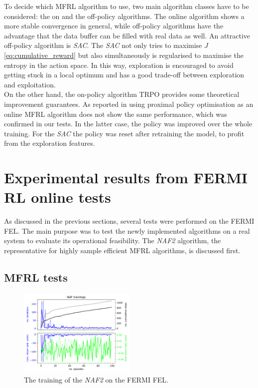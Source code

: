 \documentclass[
reprint,
amsmath,amssymb,amsfonts,clevref,
aps,
prstab,
]{revtex4-2}
\begin{document}
To decide which MFRL algorithm to use, two main algorithm classes have to be considered: the on and the off-policy algorithms. The online algorithm shows a more stable convergence in general, while off-policy algorithms have the advantage that the data buffer can be filled with real data as well. An attractive off-policy algorithm is \emph{SAC}. The \emph{SAC} not only tries to maximise $J$ \cref{eq:cumulative_reward} but also simultaneously is regularised to maximise the entropy in the action space. In this way, exploration is encouraged to avoid getting stuck in a local optimum and has a good trade-off between exploration and exploitation.\\
On the other hand, the on-policy algorithm TRPO \cite{Schulman2015} provides some theoretical improvement guarantees. As reported in \cite{Kurutach2018} using proximal policy optimisation \cite{Schulman2017} as an online MFRL algorithm does not show the same performance, which was confirmed in our tests. In the latter case, the policy was improved over the whole training. For the \emph{SAC} the policy was reset after retraining the model, to profit from the exploration features.
	\section{Experimental results from FERMI RL online tests}
	As discussed in the previous sections, several tests were performed on the FERMI FEL.
	The main purpose was to test the newly implemented algorithms on a real system to evaluate its operational feasibility. The \emph{NAF2} algorithm, the representative for highly sample efficient MFRL algorithms, is discussed first.
	\subsection{MFRL tests}
		\begin{figure}
		\centering
		\includegraphics*[width=0.5\textwidth]{Figures/FERMI_all_experiments_NAF_training_episodes.pdf}
		\caption{The training of the \emph{NAF2} on the FERMI FEL.}
		\label{fig:NAF_training}
	\end{figure}
	
\end{document}
